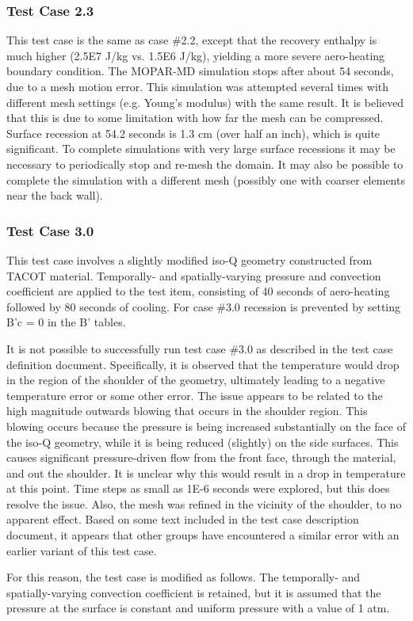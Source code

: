 \documentclass[]{article}
\begin{document}
\subsubsection{Test Case 2.3}
This test case is the same as case \#2.2, except that the recovery enthalpy is much higher (2.5E7 J/kg vs. 1.5E6 J/kg), yielding a more severe aero-heating boundary condition. The MOPAR-MD simulation stops after about 54 seconds, due to a mesh motion error. This simulation was attempted several times with different mesh settings (e.g. Young’s modulus) with the same result. It is believed that this is due to some limitation with how far the mesh can be compressed. Surface recession at 54.2 seconds is 1.3 cm (over half an inch), which is quite significant. To complete simulations with very large surface recessions it may be necessary to periodically stop and re-mesh the domain. It may also be possible to complete the simulation with a different mesh (possibly one with coarser elements near the back wall).

\subsubsection{Test Case 3.0}
This test case involves a slightly modified iso-Q geometry constructed from TACOT material. Temporally- and spatially-varying pressure and convection coefficient are applied to the test item, consisting of 40 seconds of aero-heating followed by 80 seconds of cooling. For case \#3.0 recession is prevented by setting B’c = 0 in the B’ tables. 

It is not possible to successfully run test case \#3.0 as described in the test case definition document. Specifically, it is observed that the temperature would drop in the region of the shoulder of the geometry, ultimately leading to a negative temperature error or some other error. The issue appears to be related to the high magnitude outwards blowing that occurs in the shoulder region. This blowing occurs because the pressure is being increased substantially on the face of the iso-Q geometry, while it is being reduced (slightly) on the side surfaces. This causes significant pressure-driven flow from the front face, through the material, and out the shoulder. It is unclear why this would result in a drop in temperature at this point. Time steps as small as 1E-6 seconds were explored, but this does resolve the issue. Also, the mesh was refined in the vicinity of the shoulder, to no apparent effect. Based on some text included in the test case description document, it appears that other groups have encountered a similar error with an earlier variant of this test case.

For this reason, the test case is modified as follows. The temporally- and spatially-varying convection coefficient is retained, but it is assumed that the pressure at the surface is constant and uniform pressure with a value of 1 atm. 



\end{document}
